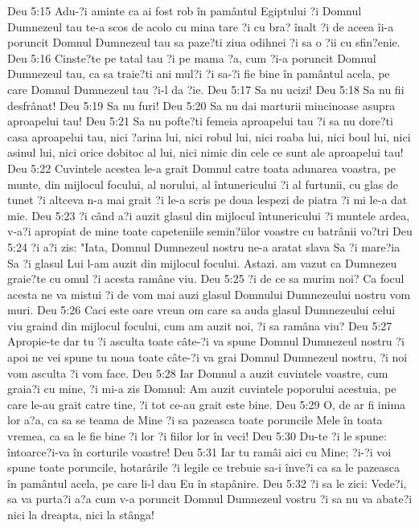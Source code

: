Deu 5:15  Adu-?i aminte ca ai fost rob în pamântul Egiptului ?i Domnul Dumnezeul tau te-a scos de acolo cu mina tare ?i cu bra? înalt ?i de aceea îi-a poruncit Domnul Dumnezeul tau sa paze?ti ziua odihnei ?i sa o ?ii cu sfin?enie.
Deu 5:16  Cinste?te pe tatal tau ?i pe mama ?a, cum ?i-a poruncit Domnul Dumnezeul tau, ca sa traie?ti ani mul?i ?i sa-?i fie bine în pamântul acela, pe care Domnul Dumnezeul tau ?i-l da ?ie.
Deu 5:17  Sa nu ucizi!
Deu 5:18  Sa nu fii desfrânat!
Deu 5:19  Sa nu furi!
Deu 5:20  Sa nu dai marturii mincinoase asupra aproapelui tau!
Deu 5:21  Sa nu pofte?ti femeia aproapelui tau ?i sa nu dore?ti casa aproapelui tau, nici ?arina lui, nici robul lui, nici roaba lui, nici boul lui, nici asinul lui, nici orice dobitoc al lui, nici nimic din cele ce sunt ale aproapelui tau!
Deu 5:22  Cuvintele acestea le-a grait Domnul catre toata adunarea voastra, pe munte, din mijlocul focului, al norului, al întunericului ?i al furtunii, cu glas de tunet ?i altceva n-a mai grait ?i le-a scris pe doua lespezi de piatra ?i mi le-a dat mie.
Deu 5:23  ?i când a?i auzit glasul din mijlocul întunericului ?i muntele ardea, v-a?i apropiat de mine toate capeteniile semin?iilor voastre cu batrânii vo?tri
Deu 5:24  ?i a?i zis: "Iata, Domnul Dumnezeul nostru ne-a aratat slava Sa ?i mare?ia Sa ?i glasul Lui l-am auzit din mijlocul focului. Astazi. am vazut ca Dumnezeu graie?te cu omul ?i acesta ramâne viu.
Deu 5:25  ?i de ce sa murim noi? Ca focul acesta ne va mistui ?i de vom mai auzi glasul Domnului Dumnezeului nostru vom muri.
Deu 5:26  Caci este oare vreun om care sa auda glasul Dumnezeului celui viu graind din mijlocul focului, cum am auzit noi, ?i sa ramâna viu?
Deu 5:27  Apropie-te dar tu ?i asculta toate câte-?i va spune Domnul Dumnezeul nostru ?i apoi ne vei spune tu noua toate câte-?i va grai Domnul Dumnezeul nostru, ?i noi vom asculta ?i vom face.
Deu 5:28  Iar Domnul a auzit cuvintele voastre, cum graia?i cu mine, ?i mi-a zis Domnul: Am auzit cuvintele poporului acestuia, pe care le-au grait catre tine, ?i tot ce-au grait este bine.
Deu 5:29  O, de ar fi inima lor a?a, ca sa se teama de Mine ?i sa pazeasca toate poruncile Mele în toata vremea, ca sa le fie bine ?i lor ?i fiilor lor în veci!
Deu 5:30  Du-te ?i le spune: întoarce?i-va în corturile voastre!
Deu 5:31  Iar tu ramâi aici cu Mine; ?i-?i voi spune toate poruncile, hotarârile ?i legile ce trebuie sa-i înve?i ca sa le pazeasca în pamântul acela, pe care li-l dau Eu în stapânire.
Deu 5:32  ?i sa le zici: Vede?i, sa va purta?i a?a cum v-a poruncit Domnul Dumnezeul vostru ?i sa nu va abate?i nici la dreapta, nici la stânga!
